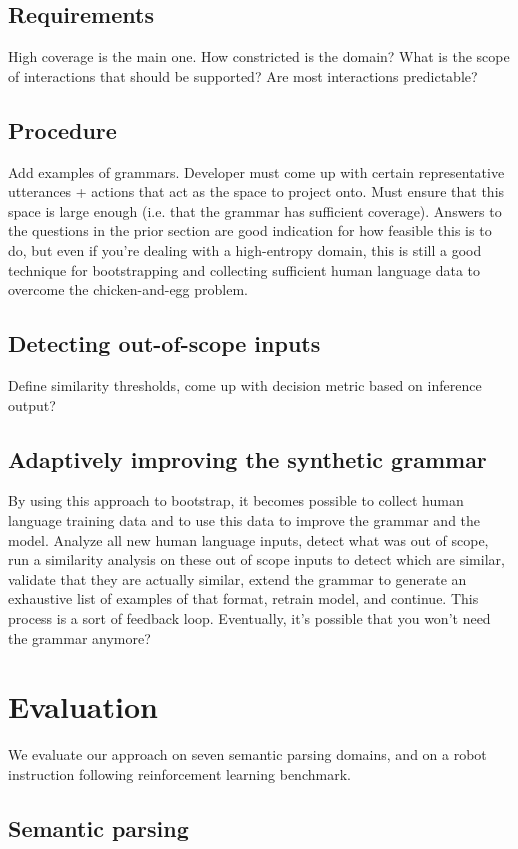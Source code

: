 \documentclass{article}
\begin{document}
\subsection{Requirements}
High coverage is the main one. How constricted is the domain? What is the scope of interactions that should be supported? Are most interactions predictable? 
\subsection{Procedure}
Add examples of grammars. Developer must come up with certain representative utterances + actions that act as the space to project onto. Must ensure that this space is large enough (i.e. that the grammar has sufficient coverage). Answers to the questions in the prior section are good indication for how feasible this is to do, but even if you're dealing with a high-entropy domain, this is still a good technique for bootstrapping and collecting sufficient human language data to overcome the chicken-and-egg problem. 
\subsection{Detecting out-of-scope inputs} 
Define similarity thresholds, come up with decision metric based on inference output? 
\subsection{Adaptively improving the synthetic grammar}
By using this approach to bootstrap, it becomes possible to collect human language training data and to use this data to improve the grammar and the model. Analyze all new human language inputs, detect what was out of scope, run a similarity analysis on these out of scope inputs to detect which are similar, validate that they are actually similar, extend the grammar to generate an exhaustive list of examples of that format, retrain model, and continue. This process is a sort of feedback loop. Eventually, it's possible that you won't need the grammar anymore?  
\section{Evaluation}
We evaluate our approach on seven semantic parsing domains, and on a robot instruction following reinforcement learning benchmark. 
\subsection{Semantic parsing}
\end{document}
